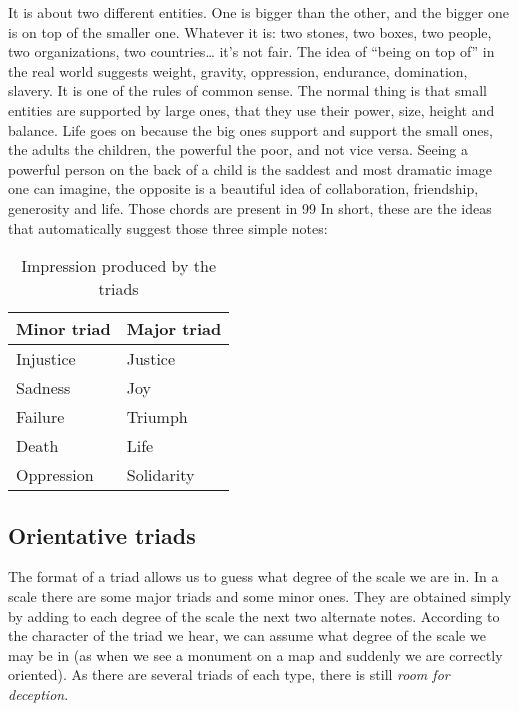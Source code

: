 \documentclass[]{report}
\begin{document}
It is about two different entities. One is bigger than the other, and the bigger one is on top of the smaller one. Whatever it is: two stones, two boxes, two people, two organizations, two countries\ldots{} it's not fair. The idea of ``being on top of'' in the real world suggests weight, gravity, oppression, endurance, domination, slavery. It is one of the rules of common sense. The normal thing is that small entities are supported by large ones, that they use their power, size, height and balance. Life goes on because the big ones support and support the small ones, the adults the children, the powerful the poor, and not vice versa. Seeing a powerful person on the back of a child is the saddest and most dramatic image one can imagine, the opposite is a beautiful idea of collaboration, friendship, generosity and life.
Those chords are present in 99%
In short, these are the ideas that automatically suggest those three simple notes:
\begin{table}[htbp]
\centering
\begin{tabular}{ll}
\toprule
\textbf{Minor triad} & \textbf{Major triad} \\
\midrule
Injustice & Justice \\
Sadness & Joy \\
Failure & Triumph \\
Death & Life \\
Oppression & Solidarity \\ 
\bottomrule
\end{tabular}
\caption{Impression produced by the triads}\label{tab:triad-impressions}
\end{table}
\subsection{Orientative triads}
The format of a triad allows us to guess what degree of the scale we are in. In a scale there are some major triads and some minor ones. They are obtained simply by adding to each degree of the scale the next two alternate notes. According to the character of the triad we hear, we can assume what degree of the scale we may be in (as when we see a monument on a map and suddenly we are correctly oriented). As there are several triads of each type, there is still \emph{room for deception}.
\end{document}
